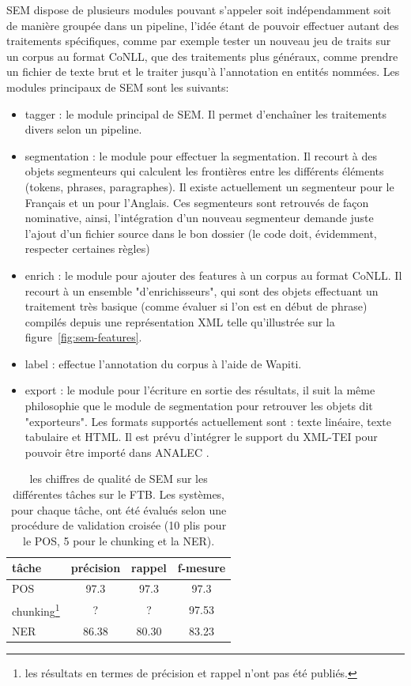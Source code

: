 \documentclass[12pt,a4paper,times,twoside,openright]{report}
\begin{document}
SEM dispose de plusieurs modules pouvant s'appeler soit indépendamment soit de manière groupée dans un pipeline, l'idée étant de pouvoir effectuer autant des traitements spécifiques, comme par exemple tester un nouveau jeu de traits sur un corpus au format CoNLL, que des traitements plus généraux, comme prendre un fichier de texte brut et le traiter jusqu'à l'annotation en entités nommées. Les modules principaux de SEM sont les suivants:
\begin{itemize}
    \item tagger : le module principal de SEM. Il permet d'enchaîner les traitements divers selon un pipeline.
    \item segmentation : le module pour effectuer la segmentation. Il recourt à des objets segmenteurs qui calculent les frontières entre les différents éléments (tokens, phrases, paragraphes). Il existe actuellement un segmenteur pour le Français et un pour l'Anglais. Ces segmenteurs sont retrouvés de façon nominative, ainsi, l'intégration d'un nouveau segmenteur demande juste l'ajout d'un fichier source dans le bon dossier (le code doit, évidemment, respecter certaines règles)
    \item enrich : le module pour ajouter des features à un corpus au format CoNLL. Il recourt à un ensemble "d'enrichisseurs", qui sont des objets effectuant un traitement très basique (comme évaluer si l'on est en début de phrase) compilés depuis une représentation XML telle qu'illustrée sur la figure\ \ref{fig:sem-features}.
    \item label : effectue l'annotation du corpus à l'aide de Wapiti.
    \item export : le module pour l'écriture en sortie des résultats, il suit la même philosophie que le module de segmentation pour retrouver les objets dit "exporteurs". Les formats supportés actuellement sont : texte linéaire, texte tabulaire et HTML. Il est prévu d'intégrer le support du XML-TEI pour pouvoir être importé dans ANALEC \citep{landragin2012analec}.
\end{itemize}

\begin{savenotes}
\begin{table}[ht!]
\centering
\begin{tabular}{|l|ccc|}
\hline
tâche    & précision & rappel & f-mesure \\
\hline
POS      & 97.3      & 97.3   & 97.3 \\
chunking\footnote{les résultats en termes de précision et rappel n'ont pas été publiés.} & ?         & ?      & 97.53 \\
NER      & 86.38     & 80.30  & 83.23 \\
\hline
\end{tabular}
\caption{les chiffres de qualité de SEM sur les différentes tâches sur le FTB. Les systèmes, pour chaque tâche, ont été évalués selon une procédure de validation croisée (10 plis pour le POS, 5 pour le chunking et la NER).}
\label{tab:SEM-misc-results}
\end{table}
\end{savenotes}
\end{document}
